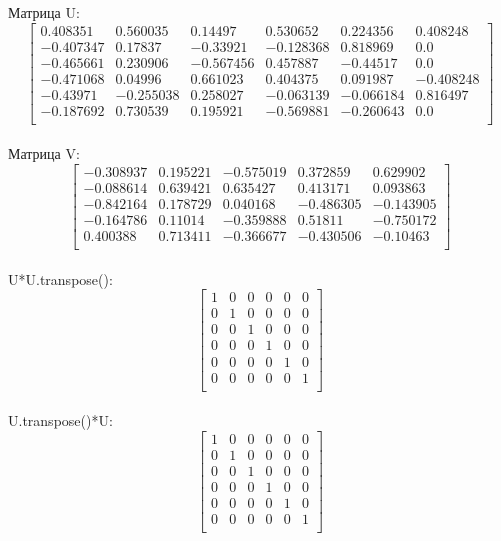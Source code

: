 \documentclass[13pt,a4paper]{scrartcl}
\begin{document}
Матрица U:\\
$$
\left[
\begin{array}{cccccc}
0.408351& 0.560035& 0.14497& 0.530652& 0.224356& 0.408248\\
-0.407347& 0.17837& -0.33921& -0.128368& 0.818969& 0.0\\
-0.465661& 0.230906& -0.567456& 0.457887& -0.44517& 0.0\\
-0.471068& 0.04996& 0.661023& 0.404375& 0.091987& -0.408248\\
-0.43971& -0.255038& 0.258027& -0.063139& -0.066184& 0.816497\\
-0.187692& 0.730539& 0.195921& -0.569881& -0.260643& 0.0\\
\end{array}
\right]
$$\\

Матрица V:\\
$$
\left[
\begin{array}{ccccc}
-0.308937& 0.195221& -0.575019& 0.372859& 0.629902\\
-0.088614&  0.639421&  0.635427&  0.413171&  0.093863\\
-0.842164&  0.178729&  0.040168& -0.486305& -0.143905\\
-0.164786&  0.11014&  -0.359888&  0.51811&  -0.750172\\
0.400388&  0.713411& -0.366677& -0.430506& -0.10463\\
\end{array}
\right]
$$\\

U*U.transpose():\\
$$
\left[
\begin{array}{cccccc}
1& 0& 0& 0& 0& 0\\
0& 1& 0& 0& 0& 0\\
0& 0& 1& 0& 0& 0\\
0& 0& 0& 1& 0& 0\\
0& 0& 0& 0& 1& 0\\
0& 0& 0& 0& 0& 1\\
\end{array}
\right]
$$\\

U.transpose()*U:\\
$$
\left[
\begin{array}{cccccc}
1& 0& 0& 0& 0& 0\\
0& 1& 0& 0& 0& 0\\
0& 0& 1& 0& 0& 0\\
0& 0& 0& 1& 0& 0\\
0& 0& 0& 0& 1& 0\\
0& 0& 0& 0& 0& 1\\
\end{array}
\right]
$$\\
\end{document}

